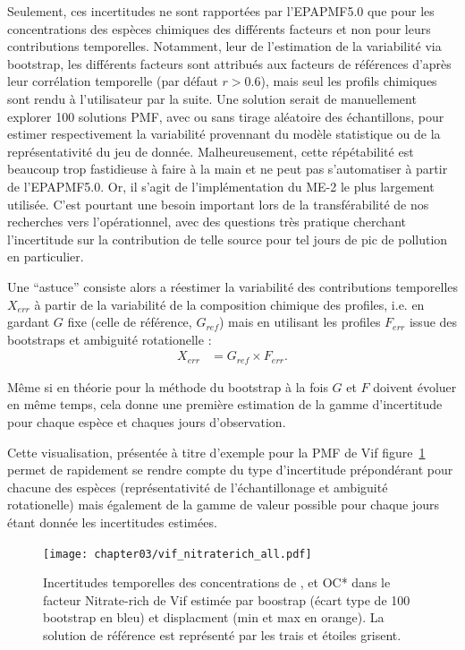 Seulement, ces incertitudes ne sont rapportées par l'EPAPMF5.0 que pour les concentrations
des espèces chimiques des différents facteurs et non pour leurs contributions temporelles.
Notamment, leur de l'estimation de la variabilité via bootstrap, les différents facteurs
sont attribués aux facteurs de références d'après leur corrélation temporelle (par défaut
$r > 0.6$), mais seul les profils chimiques sont rendu à l'utilisateur par la suite.
Une solution serait de manuellement explorer 100 solutions PMF, avec ou sans tirage
aléatoire des échantillons, pour estimer respectivement la variabilité provennant du modèle
statistique ou de la représentativité du jeu de donnée. Malheureusement, cette
répétabilité est beaucoup trop fastidieuse à faire à la main et ne peut pas s'automatiser à
partir de l'EPAPMF5.0. Or, il s'agit de l'implémentation du ME-2 le plus largement
utilisée. C'est pourtant une besoin important lors de la transférabilité de nos recherches
vers l'opérationnel, avec des questions très pratique cherchant l'incertitude
sur la contribution de telle source pour tel jours de pic de pollution en particulier.

Une ``astuce'' consiste alors a réestimer la variabilité des contributions temporelles
$X_{err}$ à partir de la variabilité de la composition chimique des profiles, i.e. en gardant
$G$ fixe (celle de référence, $G_{ref}$) mais en utilisant les profiles $F_{err}$ issue
des bootstraps et ambiguité rotationelle :
\begin{align}
    \label{eq:hack_unc}
    X_{err} &= G_{ref} \times F_{err}.
\end{align}

Même si en théorie pour la méthode du bootstrap à la fois $G$ et $F$ doivent
évoluer en même temps, cela donne une première estimation de la gamme d'incertitude pour
chaque espèce et chaques jours d'observation.

Cette visualisation, présentée à titre d'exemple pour la PMF de Vif
figure~\ref{fig:chapter03/vif_nitraterich_all} permet de rapidement se rendre compte du
type d'incertitude prépondérant pour chacune des espèces (représentativité de
l'échantillonage et ambiguité rotationelle) mais également de la gamme de valeur possible
pour chaque jours étant donnée les incertitudes estimées.

\begin{figure}[ht]
    \centering
    \texttt{[image: chapter03/vif\_nitraterich\_all.pdf]}
    \caption{Incertitudes temporelles des concentrations de \PMdix, \NOt et OC* dans le
    facteur Nitrate-rich de Vif estimée par boostrap (écart type de 100 bootstrap en bleu)
et displacment (min et max en orange). La solution de référence est représenté par les
trais et étoiles grisent.}%
    \label{fig:chapter03/vif_nitraterich_all}
\end{figure}


